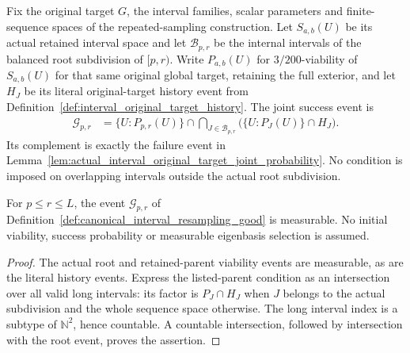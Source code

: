 \begin{definition}
    \label{def:canonical_interval_resampling_good}
    \leanok
    Fix the original target $G$, the interval families, scalar parameters
    and finite-sequence spaces of the repeated-sampling construction.
    Let $S_{a,b}(U)$ be its actual retained interval space and let
    $\mathcal B_{p,r}$ be the internal intervals of the balanced root
    subdivision of $[p,r)$. Write $P_{a,b}(U)$ for $3/200$-viability of
    $S_{a,b}(U)$ for that same original global target, retaining the full
    exterior, and let $H_J$ be its literal original-target history event
    from Definition~\ref{def:interval_original_target_history}.
    The joint success event is
    \begin{align}
        \mathcal G_{p,r}
         & =\{U:P_{p,r}(U)\}\cap
        \bigcap_{J\in\mathcal B_{p,r}}\bigl(\{U:P_J(U)\}\cap H_J\bigr).
    \end{align}
    Its complement is exactly the failure event in
    Lemma~\ref{lem:actual_interval_original_target_joint_probability}.
    No condition is imposed on overlapping intervals outside the actual
    root subdivision.
\end{definition}

\begin{lemma}
    \label{lem:canonical_interval_resampling_good_measurable}
    \leanok
    For $p\le r\le L$, the event $\mathcal G_{p,r}$ of
    Definition~\ref{def:canonical_interval_resampling_good} is measurable.
    No initial viability, success probability or measurable eigenbasis
    selection is assumed.
\end{lemma}
\begin{proof}\leanok
    The actual root and retained-parent viability events are measurable,
    as are the literal history events. Express the listed-parent condition
    as an intersection over all valid long intervals: its factor is
    $P_J\cap H_J$ when $J$ belongs to the actual subdivision and the whole
    sequence space otherwise. The long interval index is a subtype of
    $\mathbb N^2$, hence countable. A countable intersection, followed by
    intersection with the root event, proves the assertion.
\end{proof}
